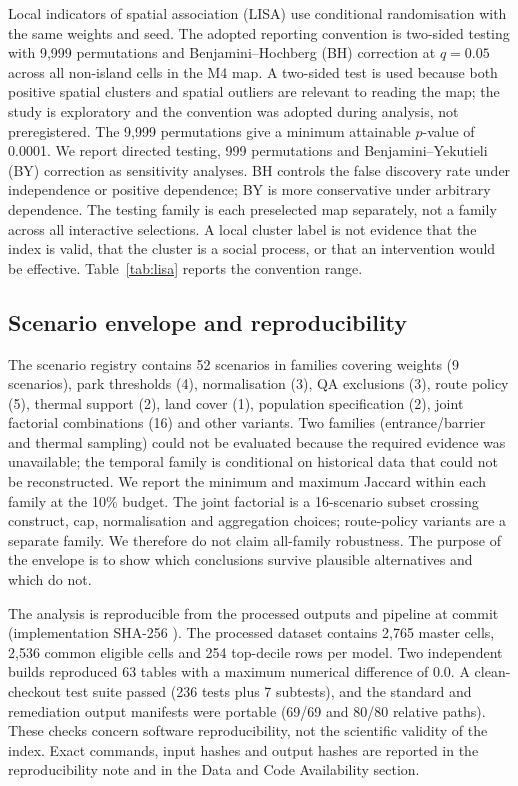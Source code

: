 \documentclass[times,twoside]{_Templates/MultiTargetManuscript}
\begin{document}
Local indicators of spatial association (LISA) use conditional randomisation
with the same weights and seed. The adopted reporting convention is two-sided
testing with 9,999 permutations and Benjamini--Hochberg (BH) correction at
$q=0.05$ across all non-island cells in the M4 map. A two-sided test is used
because both positive spatial clusters and spatial outliers are relevant to
reading the map; the study is exploratory and the convention was adopted during
analysis, not preregistered. The 9,999 permutations give a minimum attainable
$p$-value of 0.0001. We report directed testing, 999 permutations and
Benjamini--Yekutieli (BY) correction as sensitivity analyses. BH controls the
false discovery rate under independence or positive dependence; BY is more
conservative under arbitrary dependence. The testing family is each preselected
map separately, not a family across all interactive selections. A local cluster
label is not evidence that the index is valid, that the cluster is a social
process, or that an intervention would be effective. Table~\ref{tab:lisa}
reports the convention range.

\subsection{Scenario envelope and reproducibility}

The scenario registry contains 52 scenarios in families covering weights
(9 scenarios), park thresholds (4), normalisation (3), QA exclusions (3), route
policy (5), thermal support (2), land cover (1), population specification (2),
joint factorial combinations (16) and other variants. Two families
(entrance/barrier and thermal sampling) could not be evaluated because the
required evidence was unavailable; the temporal family is conditional on
historical data that could not be reconstructed. We report the minimum and maximum Jaccard within each
family at the 10\% budget. The joint factorial is a 16-scenario subset crossing
construct, cap, normalisation and aggregation choices; route-policy variants are
a separate family. We therefore do not claim all-family robustness. The purpose
of the envelope is to show which conclusions survive plausible alternatives and
which do not.

The analysis is reproducible from the processed outputs and pipeline at commit
\texttt{} (implementation
SHA-256
\texttt{}).
The processed dataset contains 2,765 master cells, 2,536 common eligible cells
and 254 top-decile rows per model. Two independent builds reproduced 63 tables
with a maximum numerical difference of 0.0. A clean-checkout test suite passed
(236 tests plus 7 subtests), and the standard and remediation output manifests
were portable (69/69 and 80/80 relative paths). These checks concern software
reproducibility, not the scientific validity of the index. Exact commands,
input hashes and output hashes are reported in the reproducibility note and in
the Data and Code Availability section.
\end{document}

